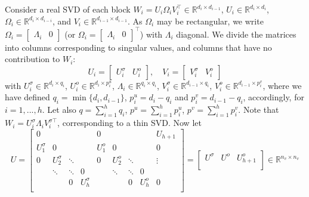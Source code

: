 \documentclass{article}
\makeatletter
\renewenvironment{proof}[1][\proofname]{
  \par\pushQED{\qed}\normalfont
  \topsep6\p@\@plus6\p@\relax
  \trivlist\item[\hskip\labelsep\bfseries#1\@addpunct{.}]
  \ignorespaces
}{
  \popQED\endtrivlist\@endpefalse
}
\newcommand{\1}{\mathds{1}}
\makeatother
\begin{document}
\begin{proof}
Consider a real SVD of each block $W_i=U_i \Omega_iV_i^\top \in\mathbb{R}^{d_i\times d_{i-1}}$, $U_i\in\mathbb{R}^{d_i\times d_i}$, $\Omega_i\in\mathbb{R}^{d_i\times d_{i-i}}$, and $V_i\in\mathbb{R}^{d_{i-1}\times d_{i-1}}$. As $\Omega_i$ may be rectangular, we write $\Omega_i = \begin{bmatrix}
\Lambda_i & 0
\end{bmatrix}$ (or $\Omega_i = \begin{bmatrix}
\Lambda_i & 0
\end{bmatrix}^\top $) with $\Lambda_i$ diagonal. 
We divide the matrices into columns corresponding to singular values, and columns that have no contribution to $W_i$:
\begin{equation}
	U_i = \begin{bmatrix}
		U_i^\sigma & U_i^{o}
	\end{bmatrix}, \quad V_i = \begin{bmatrix}
		V_i^\sigma & V_i^{o}
	\end{bmatrix}
\end{equation}
with $U_i^\sigma \in\mathbb{R}^{d_i\times q_i}$, $U_i^{o}\in\mathbb{R}^{d_i\times p_i^u}$, $\Lambda_i\in\mathbb{R}^{q_i\times q_i}$, $V_i^\sigma \in\mathbb{R}^{d_{i-1}\times q_i}$, $V_i^{o}\in\mathbb{R}^{d_{i-1}\times p_i^v}$, where we have defined $q_i=\min\{d_i,d_{i-1}\}$, $p_i^u=d_i-q_i$ and $p_i^v=d_{i-1}-q_i$, accordingly, for $i=1,...,h$. Let also $q=\sum_{i=1}^h q_i$, $p^u=\sum_{i=1}^h p_i^u$, $p^v=\sum_{i=1}^h p_i^v$. Note that $W_i=U_i^\sigma \Lambda_iV_i^{\sigma \top}$, corresponding to a thin SVD. Now let
\begin{equation}
	U = 
	\left[
	\begin{array}{cccc|cccc|c}
		0 & & & & 0 & & & & U_{h+1} \\
		U_1^\sigma & 0 & & & U_{1}^o & 0 & & &0  \\
		0 & U_2^\sigma & \ddots & & 0 & U_{2}^o &\ddots  & & \vdots\\
		& \ddots & \ddots &0  & & \ddots & \ddots & 0 & \\
		& & 0 & U_h^\sigma & & & 0 & U_{h}^o & 0\\
	\end{array}
	\right] = \left[
	\begin{array}{c|c|c}
		U^\sigma & U^o & U_{h+1}^o \\
	\end{array}
	\right] \in\mathbb{R}^{n_v\times n_v}
    \label{eq:svd_U}
\end{equation}

\end{proof}
\end{document}
